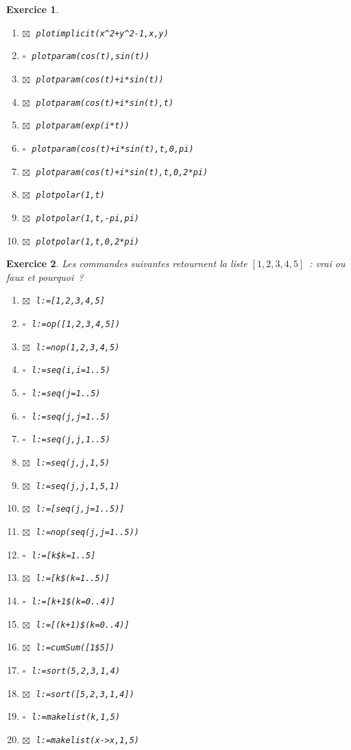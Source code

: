 \documentclass{article}
\newcommand{\faux}{$\square\;$}
\newcommand{\vrai}{$\boxtimes\;$}
\newcommand{\itemf}{\item\faux}
\newcommand{\itemvv}{\item\vrai}
\newtheorem{exo}{Exercice}[section]
\begin{document}
\begin{giacjshere}
\begin{exo}
{\begin{enumerate}
\itemvv
\verb|plotimplicit(x^2+y^2-1,x,y)|
\itemf
\verb|plotparam(cos(t),sin(t))|
\itemvv
\verb|plotparam(cos(t)+i*sin(t))|
\itemvv
\verb|plotparam(cos(t)+i*sin(t),t)|
\itemvv
\verb|plotparam(exp(i*t))|
\itemf
\verb|plotparam(cos(t)+i*sin(t),t,0,pi)|
\itemvv
\verb|plotparam(cos(t)+i*sin(t),t,0,2*pi)|
\itemvv
\verb|plotpolar(1,t)|
\itemvv
\verb|plotpolar(1,t,-pi,pi)|
\itemvv
\verb|plotpolar(1,t,0,2*pi)|
\end{enumerate}
}\end{exo}
\begin{exo}{\rm
Les commandes suivantes retournent la liste
$[1,2,3,4,5]$~: 
vrai ou faux et pourquoi~?
\begin{enumerate}
\itemvv
\verb|l:=[1,2,3,4,5]|
\itemf
\verb|l:=op([1,2,3,4,5])|
\itemvv
\verb|l:=nop(1,2,3,4,5)|
\itemf
\verb|l:=seq(i,i=1..5)|
\itemf
\verb|l:=seq(j=1..5)|
\itemf
\verb|l:=seq(j,j=1..5)|
\itemf
\verb|l:=seq(j,j,1..5)|
\itemvv
\verb|l:=seq(j,j,1,5)|
\itemvv
\verb|l:=seq(j,j,1,5,1)|
\itemvv
\verb|l:=[seq(j,j=1..5)]|
\itemvv
\verb|l:=nop(seq(j,j=1..5))|
\itemf
\verb|l:=[k$k=1..5]|
\itemvv
\verb|l:=[k$(k=1..5)]|
\itemf
\verb|l:=[k+1$(k=0..4)]|
\itemvv
\verb|l:=[(k+1)$(k=0..4)]|
\itemvv
\verb|l:=cumSum([1$5])|
\itemf
\verb|l:=sort(5,2,3,1,4)|
\itemvv
\verb|l:=sort([5,2,3,1,4])|
\itemf
\verb|l:=makelist(k,1,5)|
\itemvv
\verb|l:=makelist(x->x,1,5)|
\end{enumerate}
}\end{exo}


\end{giacjshere}
\end{document}
